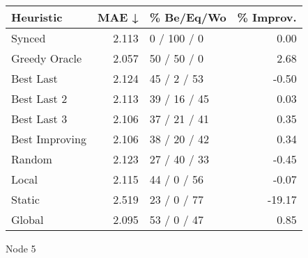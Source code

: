\begin{tabular}{lrlr}
\toprule
\textbf{Heuristic} & \textbf{MAE ↓} & \textbf{\% Be/Eq/Wo} & \textbf{\% Improv.} \\
\midrule
            Synced &          2.113 &          0 / 100 / 0 &                0.00 \\
     Greedy Oracle &          2.057 &          50 / 50 / 0 &                2.68 \\
         Best Last &          2.124 &          45 / 2 / 53 &               -0.50 \\
       Best Last 2 &          2.113 &         39 / 16 / 45 &                0.03 \\
       Best Last 3 &          2.106 &         37 / 21 / 41 &                0.35 \\
    Best Improving &          2.106 &         38 / 20 / 42 &                0.34 \\
            Random &          2.123 &         27 / 40 / 33 &               -0.45 \\
             Local &          2.115 &          44 / 0 / 56 &               -0.07 \\
            Static &          2.519 &          23 / 0 / 77 &              -19.17 \\
            Global &          2.095 &          53 / 0 / 47 &                0.85 \\
\bottomrule
\end{tabular}
\caption{Node 5}
\label{tab:hr_non_lr01_le2_bs2_5}

